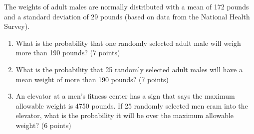 

\item The weights of adult males are normally distributed with a mean of 172 
pounds and a standard deviation of 29 pounds (based on data from the National
Health Survey). 

\begin{enumerate}
\item What is the probability that one randomly selected adult male will weigh 
more than 190 pounds? (7 points)

\vfill
\vfill

\item What is the probability that 25 randomly selected adult males will have a 
mean weight of more than 190 pounds? (7 points)


\vfill
\vfill
\vfill

\item An elevator at a men's fitness center has a sign that says the maximum 
allowable weight is 4750 pounds. If 25 randomly selected men cram into the 
elevator, what is the probability it will be over the maximum allowable weight? 
(6 points)


\vfill
\vfill

\end{enumerate}